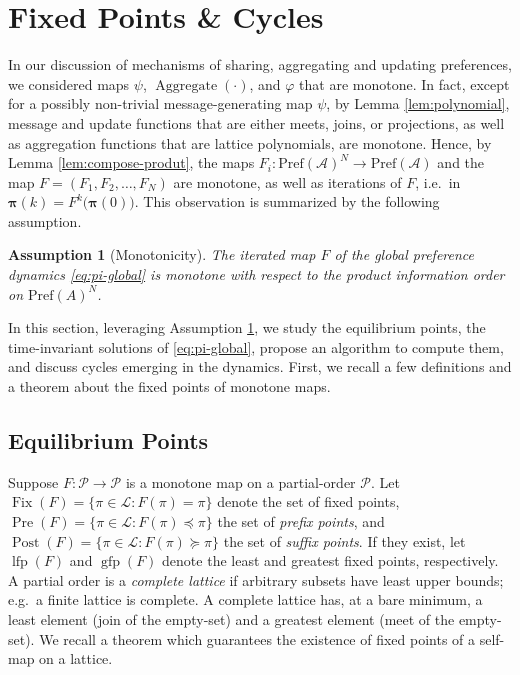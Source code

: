 \documentclass[conference]{ieeeconf}
\newcommand{\A}{\mathcal{A}}
\renewcommand{\P}{\mathcal{P}}
\newcommand{\Pref}{\mathrm{Pref}}
\renewcommand{\L}{\mathcal{L}}
\DeclareMathOperator{\Fix}{Fix}
\DeclareMathOperator{\Pre}{Pre}
\DeclareMathOperator{\Post}{Post}
\DeclareMathOperator{\lfp}{lfp}
\DeclareMathOperator{\gfp}{gfp}
\DeclareMathOperator{\Aggregate}{Aggregate}
\newtheorem{assumption}{Assumption}
\begin{document}
\section{Fixed Points \& Cycles}
\label{sec:fixed-points}

In our discussion of mechanisms of sharing, aggregating and updating preferences, we considered maps $\psi$, $\Aggregate(\cdot)$, and $\varphi$ that are monotone. In fact, except for a possibly non-trivial message-generating map $\psi$, by Lemma \ref{lem:polynomial}, message and update functions that are either meets, joins, or projections, as well as aggregation functions that are lattice polynomials, are monotone. Hence, by Lemma \ref{lem:compose-produt}, the maps $F_i: \Pref(\A)^N \to \Pref(\A)$ and the map $F = (F_1,F_2,\dots,F_N)$ are monotone, as well as iterations of $F$, i.e.~in $\boldsymbol{\pi}(k) = F^k \bigl( \boldsymbol{\pi}(0) \bigr)$. This observation is summarized by the following assumption.

\begin{assumption}[Monotonicity] \label{ass:monotone}
    The iterated map $F$ of the global preference dynamics \eqref{eq:pi-global} is monotone with respect to the product information order on $\Pref(A)^N$.
\end{assumption}

In this section, leveraging Assumption \ref{ass:monotone}, we study the equilibrium points, the time-invariant solutions of \eqref{eq:pi-global}, propose an algorithm to compute them, and discuss cycles emerging in the dynamics. First, we recall a few definitions and a theorem about the fixed points of monotone maps. 

\subsection{Equilibrium Points}

Suppose $F: \P \to \P$ is a monotone map on a partial-order $\P$. Let $\Fix(F) = \{ \pi \in \L: F(\pi) = \pi \}$ denote the set of fixed points, $\Pre(F) = \{ \pi \in \L : F(\pi) \preceq \pi\}$ the set of \emph{prefix points}, and $\Post(F) =\{ \pi \in \L : F(\pi) \succeq \pi\}$ the set of \emph{suffix points}. If they exist, let $\lfp(F)$ and $\gfp(F)$ denote the least and greatest fixed points, respectively. A partial order is a \emph{complete lattice} if arbitrary subsets have least upper bounds; e.g.~a finite lattice is complete. A complete lattice has, at a bare minimum, a least element (join of the empty-set) and a greatest element (meet of the empty-set). We recall a theorem which guarantees the existence of fixed points of a self-map on a lattice.
\end{document}
